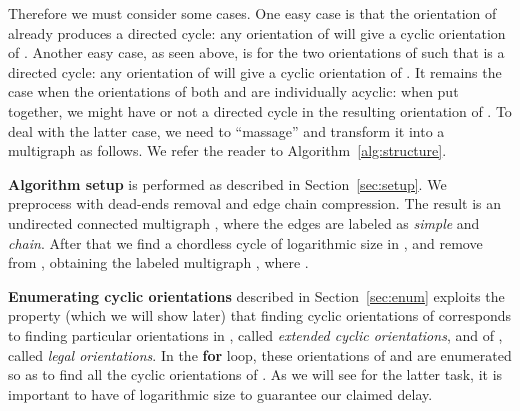 \documentclass{llncs}
\begin{document}
Therefore we must consider some cases. One easy case is that the orientation of  already produces a directed cycle: any orientation of  will give a cyclic orientation of . Another easy case, as seen above, is for the two orientations of  such that  is a directed cycle:  any orientation of  will give a cyclic orientation of . It remains the case when the orientations of both  and  are individually acyclic: when put together, we might have or not a directed cycle in the resulting orientation of . To deal with the latter case, we need to ``massage''  and transform it into a multigraph as follows. We refer the reader to Algorithm~\ref{alg:structure}. 

\textbf{Algorithm setup} is performed as described in Section~\ref{sec:setup}. We preprocess  with dead-ends removal and edge chain compression. The result is an undirected connected multigraph , where the edges are labeled as \emph{simple} and \emph{chain}. After that we find a chordless cycle of logarithmic size  in , and remove  from , obtaining the labeled multigraph , where .  

\textbf{Enumerating cyclic orientations} described in Section~\ref{sec:enum} exploits the property (which we will show later) that finding cyclic orientations of  corresponds to finding particular orientations in , called \emph{extended cyclic orientations}, and of , called \emph{legal orientations}. In the \textbf{for} loop, these orientations of  and  are enumerated so as to find all the cyclic orientations of . As we will see for the latter task, it is important to have  of logarithmic size to guarantee our claimed delay.
\end{document}
